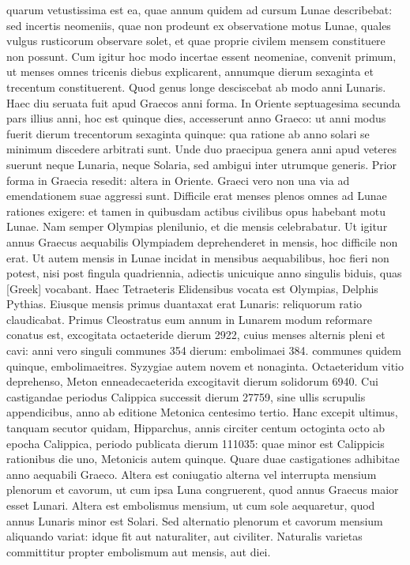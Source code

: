 quarum vetustissima est ea, quae annum quidem ad cursum
Lunae describebat:
sed incertis neomeniis, quae non prodeunt ex observatione
motus Lunae, quales vulgus rusticorum observare solet, et
quae proprie civilem mensem constituere non possunt.
Cum igitur
hoc modo incertae essent neomeniae, convenit primum, ut menses omnes
tricenis diebus explicarent, annumque dierum sexaginta et trecentum
constituerent.
Quod genus longe desciscebat ab modo anni
Lunaris.
Haec diu seruata fuit apud Graecos anni forma.
In Oriente
septuagesima secunda pars illius anni, hoc est quinque dies, accesserunt
anno Graeco: ut anni modus fuerit dierum trecentorum sexaginta quinque:
qua ratione ab anno solari se minimum discedere arbitrati sunt.
Unde duo praecipua genera anni apud veteres suerunt neque Lunaria,
neque Solaria, sed ambigui inter utrumque generis.
Prior forma in
Graecia resedit: altera in Oriente.
Graeci vero non una via ad emendationem
suae aggressi sunt.
Difficile erat menses plenos omnes ad
Lunae rationes exigere: et tamen in quibusdam actibus civilibus opus
habebant motu Lunae.
Nam semper Olympias plenilunio, et 
die mensis celebrabatur.
Ut igitur annus Graecus aequabilis Olympiadem
deprehenderet in  mensis, hoc difficile non erat.
Ut autem
 mensis in 
 Lunae incidat in mensibus aequabilibus, hoc fieri non
potest, nisi post fingula quadriennia, adiectis unicuique anno singulis
biduis, quas \textgreek{[Greek]} vocabant.
Haec Tetraeteris Elidensibus
vocata est Olympias, Delphis Pythias.
Eiusque mensis primus duantaxat
erat Lunaris: reliquorum ratio claudicabat.
Primus Cleostratus
eum annum in Lunarem modum reformare conatus est, excogitata
octaeteride dierum 2922, cuius menses alternis pleni et cavi: anni vero
singuli communes 354 dierum: embolimaei 384. communes quidem
quinque, embolimaeitres.
Syzygiae autem novem et nonaginta.
Octaeteridum
vitio deprehenso, Meton enneadecaeterida excogitavit dierum
solidorum 6940.
Cui castigandae periodus Calippica successit dierum
27759, sine ullis scrupulis appendicibus, anno ab editione Metonica
centesimo tertio.
Hanc excepit ultimus, tanquam secutor quidam,
Hipparchus, annis circiter centum octoginta octo ab epocha Calippica,
periodo publicata dierum 111035: quae minor est Calippicis rationibus
die uno, Metonicis autem quinque.
Quare duae castigationes adhibitae
anno aequabili Graeco.
Altera est coniugatio alterna vel interrupta
mensium plenorum et cavorum, ut cum ipsa Luna congruerent, quod
annus Graecus maior esset Lunari.
Altera est embolismus mensium, ut
cum sole aequaretur, quod annus Lunaris minor est Solari.
Sed alternatio
plenorum et cavorum mensium aliquando variat: idque fit aut
naturaliter, aut civiliter.
Naturalis varietas committitur propter embolismum
aut mensis, aut diei.

